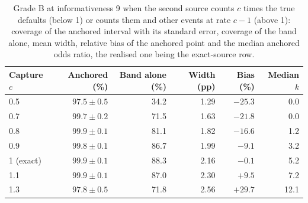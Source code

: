 \begin{table}[htbp]
\centering
\small
\caption{Grade B at informativeness 9 when the second source counts $c$ times the true defaults (below 1) or counts them and other events at rate $c-1$ (above 1): coverage of the anchored interval with its standard error, coverage of the band alone, mean width, relative bias of the anchored point and the median anchored odds ratio, the realised one being the exact-source row.}
\label{tab:capture}
\begin{tabular}{lrrrrr}
\toprule
Capture $c$ & Anchored (\%) & Band alone (\%) & Width (pp) & Bias (\%) & Median $k$ \\
\midrule
0.5 & $97.5\pm0.5$ & 34.2 & 1.29 & $-25.3$ & 0.0 \\
0.7 & $99.7\pm0.2$ & 71.5 & 1.63 & $-21.8$ & 0.0 \\
0.8 & $99.9\pm0.1$ & 81.1 & 1.82 & $-16.6$ & 1.2 \\
0.9 & $99.8\pm0.1$ & 86.7 & 1.99 & $-9.1$ & 3.2 \\
1 (exact) & $99.9\pm0.1$ & 88.3 & 2.16 & $-0.1$ & 5.2 \\
1.1 & $99.9\pm0.1$ & 87.0 & 2.30 & $+9.5$ & 7.2 \\
1.3 & $97.8\pm0.5$ & 71.8 & 2.56 & $+29.7$ & 12.1 \\
\bottomrule
\end{tabular}
\end{table}
